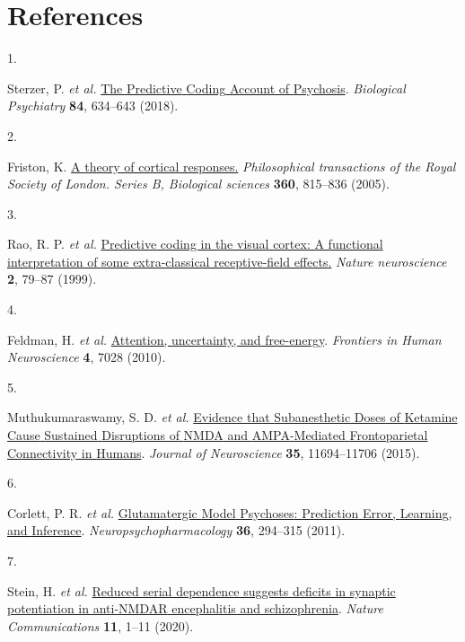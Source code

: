 \documentclass[
]{article}
\newlength{\cslhangindent}
\newlength{\csllabelwidth}
\newenvironment{CSLReferences}[2] %
 {\begin{list}{}{%
  \setlength{\itemindent}{0pt}
  \setlength{\leftmargin}{0pt}
  \setlength{\parsep}{0pt}
  \ifodd #1
   \setlength{\leftmargin}{\cslhangindent}
   \setlength{\itemindent}{-1\cslhangindent}
  \fi
  \setlength{\itemsep}{#2\baselineskip}}}
 {\end{list}}
\newcommand{\CSLLeftMargin}[1]{\parbox[t]{\csllabelwidth}{\strut#1\strut}}
\newcommand{\CSLRightInline}[1]{\parbox[t]{\linewidth - \csllabelwidth}{\strut#1\strut}}
\begin{document}
\newpage

\section*{References}\label{references}

\label{refs}
\begin{CSLReferences}{0}{0}
\CSLLeftMargin{1. }%
\CSLRightInline{Sterzer, P. \emph{et al.}
\href{https://doi.org/10.1016/j.biopsych.2018.05.015}{The {Predictive}
{Coding} {Account} of {Psychosis}}. \emph{Biological Psychiatry}
\textbf{84}, 634--643 (2018).}

\CSLLeftMargin{2. }%
\CSLRightInline{Friston, K.
\href{https://doi.org/10.1098/rstb.2005.1622}{A theory of cortical
responses.} \emph{Philosophical transactions of the Royal Society of
London. Series B, Biological sciences} \textbf{360}, 815--836 (2005).}

\CSLLeftMargin{3. }%
\CSLRightInline{Rao, R. P. \emph{et al.}
\href{https://doi.org/10.1038/4580}{Predictive coding in the visual
cortex: A functional interpretation of some extra-classical
receptive-field effects.} \emph{Nature neuroscience} \textbf{2}, 79--87
(1999).}

\CSLLeftMargin{4. }%
\CSLRightInline{Feldman, H. \emph{et al.}
\href{https://doi.org/10.3389/FNHUM.2010.00215/BIBTEX}{Attention,
uncertainty, and free-energy}. \emph{Frontiers in Human Neuroscience}
\textbf{4}, 7028 (2010).}

\CSLLeftMargin{5. }%
\CSLRightInline{Muthukumaraswamy, S. D. \emph{et al.}
\href{https://doi.org/10.1523/JNEUROSCI.0903-15.2015}{Evidence that
{Subanesthetic} {Doses} of {Ketamine} {Cause} {Sustained} {Disruptions}
of {NMDA} and {AMPA}-{Mediated} {Frontoparietal} {Connectivity} in
{Humans}}. \emph{Journal of Neuroscience} \textbf{35}, 11694--11706
(2015).}

\CSLLeftMargin{6. }%
\CSLRightInline{Corlett, P. R. \emph{et al.}
\href{https://doi.org/10.1038/npp.2010.163}{Glutamatergic {Model}
{Psychoses}: {Prediction} {Error}, {Learning}, and {Inference}}.
\emph{Neuropsychopharmacology} \textbf{36}, 294--315 (2011).}

\CSLLeftMargin{7. }%
\CSLRightInline{Stein, H. \emph{et al.}
\href{https://doi.org/10.1038/s41467-020-18033-3}{Reduced serial
dependence suggests deficits in synaptic potentiation in anti-{NMDAR}
encephalitis and schizophrenia}. \emph{Nature Communications}
\textbf{11}, 1--11 (2020).}


\end{CSLReferences}
\end{document}
